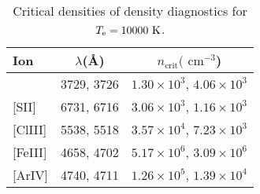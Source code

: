 \documentclass[fleqn,usenatbib]{mnras}
\begin{document}
\begin{table}
\caption{Critical densities of density diagnostics for $T_{\rm e}=10000 \text{ K}$.}
\label{tab:critical_densities}
\begin{tabular}{lcc}
\hline
Ion & $\lambda$(\AA) & $n_{\text{crit}}(\text{ cm}^{-3}$)\\
\hline
[O\thinspace II]   &  3729, 3726 & $1.30\times 10^{3}$, $4.06\times 10^{3}$ \\

[S\thinspace II]   &  6731, 6716 & $3.06\times 10^{3}$, $1.16\times 10^{3}$ \\

[Cl\thinspace III]  &  5538, 5518 & $3.57\times 10^{4}$, $7.23\times 10^{3}$ \\

[Fe\thinspace III]  &  4658, 4702 & $5.17\times 10^{6}$, $3.09\times 10^{6}$  \\

[Ar\thinspace IV]  &  4740, 4711 & $1.26\times 10^{5}$, $1.39\times 10^{4}$ \\
\hline
\end{tabular}
\end{table}
\end{document}
